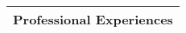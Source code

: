 \Large
\begin{tabularx}{\linewidth}{@{}l}
    Professional Experiences\\
    \hline
\end{tabularx}
\normalsize